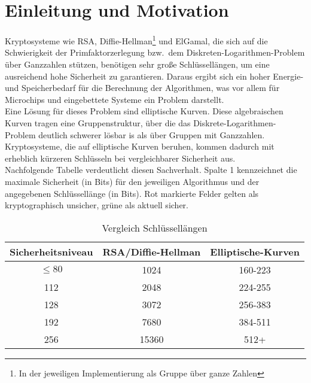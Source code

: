 \documentclass[hidelinks]{article}
\theoremstyle{plain}
\theoremstyle{definition}
\theoremstyle{rem}
\begin{document}
\begin{sloppypar}

\section{Einleitung und Motivation}
Kryptosysteme wie RSA, Diffie-Hellman\footnote{In der jeweiligen Implementierung als Gruppe über ganze Zahlen} und ElGamal\footnotemark[\value{footnote}], die sich auf die Schwierigkeit der Primfaktorzerlegung bzw.\ dem Diskreten-Logarithmen-Problem über Ganzzahlen stützen, benötigen sehr große Schlüssellängen, um eine ausreichend hohe Sicherheit zu garantieren. 
Daraus ergibt sich ein hoher Energie- und Speicherbedarf für die Berechnung der Algorithmen, was vor allem für Microchips und eingebettete Systeme ein Problem darstellt.\\
Eine Lösung für dieses Problem sind elliptische Kurven. Diese algebraischen Kurven tragen eine Gruppenstruktur, über die das Diskrete-Logarithmen-Problem deutlich schwerer lösbar is als über Gruppen mit Ganzzahlen.
Kryptosysteme, die auf elliptische Kurven beruhen, kommen dadurch mit erheblich kürzeren Schlüsseln bei vergleichbarer Sicherheit aus.\cite[Seite~53]{nist}\\
Nachfolgende Tabelle verdeutlicht diesen Sachverhalt. Spalte 1 kennzeichnet die maximale Sicherheit (in Bits) für den jeweiligen Algorithmus und der angegebenen Schlüssellänge (in Bits). Rot markierte Felder gelten als kryptographisch unsicher, grüne als aktuell sicher.
\begin{table}[h]
\centering
	\begin{tabular}{| c | c | c |}
	\hline
	\rowcolor{lightblue}
	Sicherheitsniveau & RSA/Diffie-Hellman\footnotemark[\value{footnote}] & Elliptische-Kurven\\ \hline
	\rowcolor{lightred}
	$\le80$ 	& 1024 & 160-223 \\ \hline
	\rowcolor{lightgreen}
	112 	& 2048 & 224-255 \\ \hline
	\rowcolor{lightgreen}
	128 	& 3072 & 256-383 \\ \hline
	\rowcolor{lightgreen}
	192 	& 7680 & 384-511 \\ \hline
	\rowcolor{lightgreen}
	256 	& 15360 & 512+ \\ \hline
	\end{tabular}
\caption{Vergleich Schlüssellängen}
\label{keylength}
\end{table}


\end{sloppypar}
\end{document}
